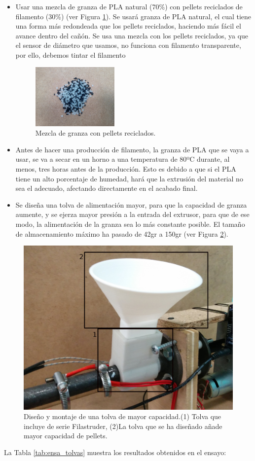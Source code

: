 \begin{itemize}
    \item{Usar una mezcla de granza de PLA natural (70\%) con pellets reciclados de filamento (30\%) (ver Figura \ref{fig:2007105-mezc}). Se usará granza de PLA natural, el cual tiene una forma más redondeada que los pellets reciclados, haciendo más fácil el avance dentro del cañón. Se usa una mezcla con los pellets reciclados, ya que el sensor de diámetro que usamos, no funciona con filamento transparente, por ello, debemos tintar el filamento}
	    \begin{figure}[H]
		    \centering
		    \includegraphics[width=0.4\textwidth]{images/producciones/20072015/IMG_20150903_155859.jpg}
		    \caption{Mezcla de granza con pellets reciclados.}
		    \label{fig:2007105-mezc}
		\end{figure}
    \item{Antes de hacer una producción de filamento, la granza de PLA que se vaya a usar, se va a secar en un horno a una temperatura de 80ºC durante, al menos, tres horas antes de la producción. Esto es debido a que si el PLA tiene un alto porcentaje de humedad, hará que la extrusión del material no sea el adecuado, afectando directamente en el acabado final.}
    \item{Se diseña una tolva de alimentación mayor, para que la capacidad de granza aumente, y se ejerza mayor presión a la entrada del extrusor, para que de ese modo, la alimentación de la granza sea lo más constante posible. El tamaño de almacenamiento máximo ha pasado de 42gr a 150gr (ver Figura \ref{fig:tolv_montaj}).}
\end{itemize}

\begin{figure}[H]
    \centering
        \includegraphics[width=0.5\linewidth]{images/producciones/20072015/IMG_20150721_121904.jpg}
        \caption[Diseño y montaje de una tolva de mayor capacidad.]{Diseño y montaje de una tolva de mayor capacidad.(1) Tolva que incluye de serie Filastruder, (2)La tolva que se ha diseñado añade mayor capacidad de pellets.}
        \label{fig:tolv_montaj}
\end{figure}
\pagebreak
La Tabla \ref{tab:ensa_tolvas} muestra los resultados obtenidos en el ensayo:

